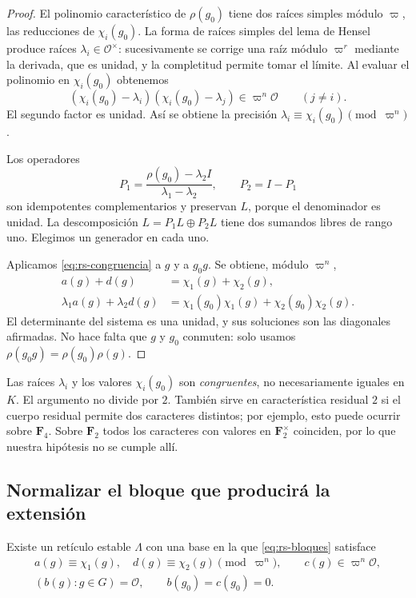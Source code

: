 \begin{proof}
El polinomio característico de $\rho(g_0)$ tiene dos raíces
simples módulo $\varpi$, las reducciones de $\chi_i(g_0)$.
La forma de raíces simples del lema de Hensel produce raíces
$\lambda_i\in\mathcal O^\times$: sucesivamente se corrige una
raíz módulo $\varpi^r$ mediante la derivada, que es unidad,
y la completitud permite tomar el límite.
Al evaluar el polinomio en $\chi_i(g_0)$ obtenemos
\[
 (\chi_i(g_0)-\lambda_i)(\chi_i(g_0)-\lambda_j)
 \in\varpi^n\mathcal O\qquad(j\ne i).
\]
El segundo factor es unidad. Así se obtiene la precisión
$\lambda_i\equiv\chi_i(g_0)\pmod{\varpi^n}$.

Los operadores
\[
 P_1=\frac{\rho(g_0)-\lambda_2 I}{\lambda_1-\lambda_2},
 \qquad P_2=I-P_1
\]
son idempotentes complementarios y preservan $L$, porque el
denominador es unidad. La descomposición $L=P_1L\oplus P_2L$
tiene dos sumandos libres de rango uno. Elegimos un generador
en cada uno.

Aplicamos \eqref{eq:rs-congruencia} a $g$ y a $g_0g$. Se obtiene,
módulo $\varpi^n$,
\[
 \begin{split}
 a(g)+d(g)&=\chi_1(g)+\chi_2(g),\\
 \lambda_1a(g)+\lambda_2d(g)
 &=\chi_1(g_0)\chi_1(g)+\chi_2(g_0)\chi_2(g).
 \end{split}
\]
El determinante del sistema es una unidad, y sus soluciones son
las diagonales afirmadas. No hace falta que $g$ y $g_0$ conmuten:
solo usamos $\rho(g_0g)=\rho(g_0)\rho(g)$.
\end{proof}

Las raíces $\lambda_i$ y los valores $\chi_i(g_0)$ son
\emph{congruentes}, no necesariamente iguales en $K$.
El argumento no divide por $2$. También sirve en característica
residual $2$ si el cuerpo residual permite dos caracteres distintos;
por ejemplo, esto puede ocurrir sobre $\mathbf F_4$. Sobre
$\mathbf F_2$ todos los caracteres con valores en
$\mathbf F_2^\times$ coinciden, por lo que nuestra hipótesis no se
cumple allí.

\subsection{Normalizar el bloque que producirá la extensión}

\begin{proposicion}
\label{prop:rs-normalizar}
Existe un retículo estable $\Lambda$ con una base en la que
\eqref{eq:rs-bloques} satisface
\begin{equation}
 \begin{gathered}
 a(g)\equiv\chi_1(g),\quad d(g)\equiv\chi_2(g)
       \pmod{\varpi^n},\qquad c(g)\in\varpi^n\mathcal O,\\
 (b(g):g\in G)=\mathcal O,\qquad b(g_0)=c(g_0)=0.
 \end{gathered}
 \label{eq:rs-normalizado}
\end{equation}
\end{proposicion}

